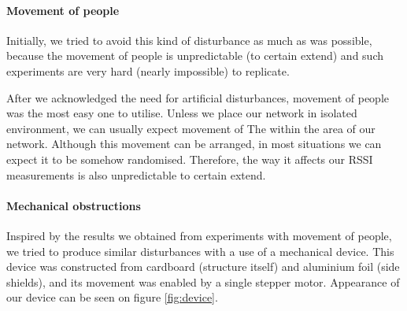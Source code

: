 \documentclass[
  print, %
  Table,   %
  nolof,     %
  nolot,     %
           oneside
]{fithesis3}
\begin{document}
  \paragraph{Movement of people}\label{subsubsec:people}
  Initially, we tried to avoid this kind of disturbance as much as was possible, because the movement of people is unpredictable (to certain extend) and such experiments are very hard (nearly impossible) to replicate.

  After we acknowledged the need for artificial disturbances, movement of people was the most easy one to utilise. Unless we place our network in isolated environment, we can usually expect movement of The within the area of our network. Although this movement can be arranged, in most situations we can expect it to be somehow randomised. Therefore, the way it affects our RSSI measurements is also unpredictable to certain extend.

  \paragraph{Mechanical obstructions}\label{subsec:shield}
  Inspired by the results we obtained from experiments with movement of people, we tried to produce similar disturbances with a use of a mechanical device. This device was constructed from cardboard (structure itself) and aluminium foil (side shields), and its movement was enabled by a single stepper motor. Appearance of our device can be seen on figure \ref{fig:device}. %
\end{document}
